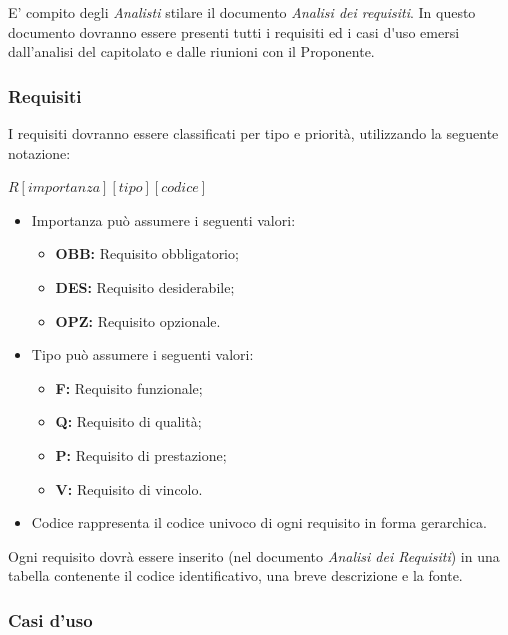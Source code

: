 E' compito degli \textit{Analisti} stilare il documento \textit{Analisi dei requisiti}.
In questo documento dovranno essere presenti tutti i requisiti ed i \gls{casi d'uso} emersi dall'analisi del capitolato e dalle riunioni con il Proponente.\\

\subsubsection{Requisiti}

I requisiti dovranno essere classificati per tipo e priorità, utilizzando la seguente notazione:

\begin{center}
\begin{math}
R \left [ importanza \right ] \left [ tipo\right ]\left [codice\right ]
\end{math}
\end{center}
\begin{itemize}
  \item Importanza può assumere i seguenti valori:
\begin{itemize}
	\item \textbf{OBB:} Requisito obbligatorio;
	\item \textbf{DES:} Requisito desiderabile;
	\item \textbf{OPZ:} Requisito opzionale.
\end{itemize}
  \item Tipo può assumere i seguenti valori:
\begin{itemize}
	\item \textbf{F:} Requisito funzionale;
	\item \textbf{Q:} Requisito di qualità;
	\item \textbf{P:} Requisito di prestazione;
	\item \textbf{V:} Requisito di vincolo.
\end{itemize}
  \item Codice rappresenta il codice univoco di ogni requisito in forma gerarchica.
\end{itemize}
Ogni requisito dovrà essere inserito (nel documento \textit{Analisi dei Requisiti}) in una tabella contenente il codice identificativo, una breve descrizione e la fonte.

\subsubsection{Casi d'uso}

